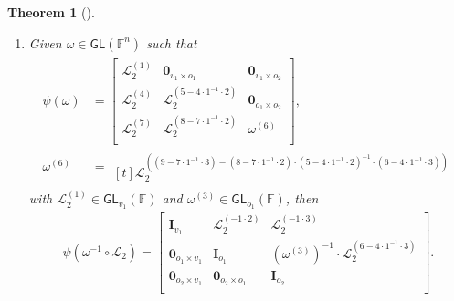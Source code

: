 \documentclass[english]{ufsc-thesis-rn46-2019/ufsc-thesis-rn46-2019}
\newtheorem{theorem}{Theorem}[section]
\theoremstyle{definition}
\begin{document}
\begin{theorem}[{\cite[Thm.~3.6]{Petzoldt:201307}}]
\begin{enumerate}
    \item Given $\omega \in \mathsf{GL}(\mathbb{F}^{n})$ such that
      \begin{align}
        \begin{split}
          \psi(\omega) &=
          \begin{bmatrix}
            \mathcal{L}_{2}^{(1)}
              & \mathbf{0}_{v_{1} \times o_{1}}
              & \mathbf{0}_{v_{1} \times o_{2}} \\
            \mathcal{L}_{2}^{(4)}
              & \mathcal{L}_{2}^{(5 - 4 \cdot 1^{-1} \cdot 2)}
              & \mathbf{0}_{o_{1} \times o_{2}} \\
            \mathcal{L}_{2}^{(7)}
              & \mathcal{L}_{2}^{(8 - 7 \cdot 1^{-1} \cdot 2)}
              & \omega^{(6)}                    \\
          \end{bmatrix}, \\
          \omega^{(6)} &=
          \begin{multlined}[t]
            \mathcal{L}_{2}^{((9 - 7 \cdot 1^{-1} \cdot 3)
              -(8 - 7 \cdot 1^{-1} \cdot 2)
              \cdot {(5 - 4 \cdot 1^{-1} \cdot 2)}^{-1}
              \cdot (6 - 4 \cdot 1^{-1} \cdot 3))}
          \end{multlined}
        \end{split}
      \end{align}
      with $\mathcal{L}_{2}^{(1)} \in \mathsf{GL}_{v_{1}}(\mathbb{F})$ and
      $\omega^{(3)} \in \mathsf{GL}_{o_{1}}(\mathbb{F})$, then
      \begin{align}
        \psi(\omega^{-1} \circ \mathcal{L}_{2}) =
        \begin{bmatrix}
          \mathbf{I}_{v_{1}}              & \mathcal{L}_{2}^{(-1 \cdot 2)}
            & \mathcal{L}_{2}^{(-1 \cdot 3)} \\
          \mathbf{0}_{o_{1} \times v_{1}} & \mathbf{I}_{o_{1}}
            & {(\omega^{(3)})}^{-1}
              \cdot \mathcal{L}_{2}^{(6 - 4 \cdot 1^{-1} \cdot 3)} \\
          \mathbf{0}_{o_{2} \times v_{1}} & \mathbf{0}_{o_{2} \times o_{1}}
            & \mathbf{I}_{o_{2}} \\
        \end{bmatrix}.
      \end{align}
  \end{enumerate}
\end{theorem}
\end{document}
